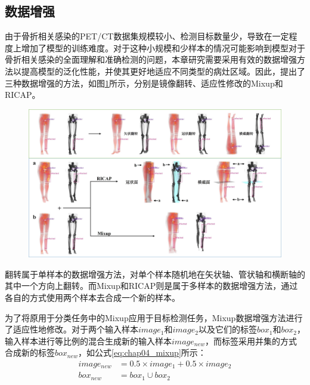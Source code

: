 \subsection{数据增强}

由于骨折相关感染的PET/CT数据集规模较小、检测目标数量少，导致在一定程度上增加了模型的训练难度。对于这种小规模和少样本的情况可能影响到模型对于骨折相关感染的全面理解和准确检测的问题，本章研究需要采用有效的数据增强方法以提高模型的泛化性能，并使其更好地适应不同类型的病灶区域。因此，提出了三种数据增强的方法，如图\ref{fig:chap04_augmentation}所示，分别是镜像翻转、适应性修改的Mixup和RICAP。

\begin{figure}[htbp]
  \centering
  \includegraphics[width=\textwidth]{figures/chap04_augmentation.jpg}
  \label{fig:chap04_augmentation}
\end{figure}

翻转属于单样本的数据增强方法，对单个样本随机地在矢状轴、管状轴和横断轴的其中一个方向上翻转。而Mixup和RICAP则是属于多样本的数据增强方法，通过各自的方式使用两个样本去合成一个新的样本。

为了将原用于分类任务中的Mixup应用于目标检测任务，Mixup数据增强方法进行了适应性地修改。对于两个输入样本\(image_1\)和\(image_2\)以及它们的标签\(box_1\)和\(box_2\)，输入样本进行等比例的混合生成新的输入样本\(image_{new}\)，而标签采用并集的方式合成新的标签\(box_{new}\)，如公式\ref{eq:chap04_mixup}所示：
\begin{equation}
  \begin{aligned}
    image_{new} & = 0.5 \times image_1 + 0.5 \times image_2 \\
    box_{new}   & = box_1 \cup box_2
  \end{aligned}
  \label{eq:chap04_mixup}
\end{equation}

